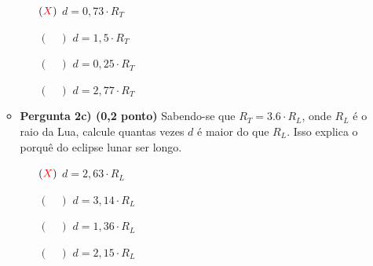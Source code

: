\documentclass[a4paper, 12pt]{article}
\newcommand{\red}[1]{\textcolor{red}{#1}}
\begin{document}
\begin{flushleft}
\begin{itemize}
\begin{itemize}
\begin{figure}[H]
                    \end{figure}
                    \begin{itemize}
                        \item[$(\red{X})$] $d = 0,73 \cdot R_T$
                        \item[$(\quad)$] $d = 1,5 \cdot R_T$
                        \item[$(\quad)$] $d = 0,25 \cdot R_T$
                        \item[$(\quad)$] $d = 2,77 \cdot R_T$
                    \end{itemize}
                \item \textbf{Pergunta 2c) (0,2 ponto)} Sabendo-se  que $R_T = 3.6 \cdot R_L$,  onde $R_L$ é o raio da Lua, calcule quantas vezes $d$ é maior do que $R_L$. Isso explica o porquê do eclipse lunar ser longo.
                    \begin{itemize}
                        \item[$(\red{X})$] $d = 2,63 \cdot R_L$
                        \item[$(\quad)$] $d = 3,14 \cdot R_L$
                        \item[$(\quad)$] $d = 1,36 \cdot R_L$
                        \item[$(\quad)$] $d = 2,15 \cdot R_L$
                    \end{itemize}
            \end{itemize}


\end{itemize}
\end{flushleft}
\end{document}
